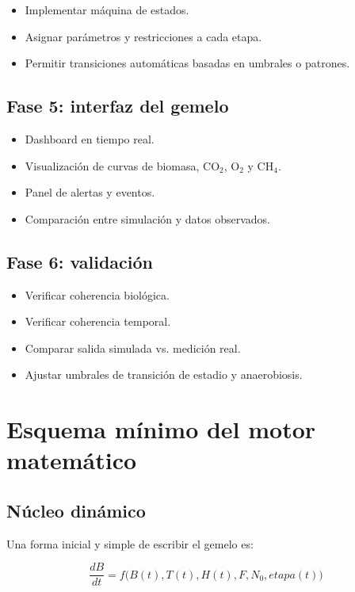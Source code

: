 \documentclass[12pt,a4paper]{report}
\begin{document}
\begin{itemize}[leftmargin=0.7cm]
    \item Implementar máquina de estados.
    \item Asignar parámetros y restricciones a cada etapa.
    \item Permitir transiciones automáticas basadas en umbrales o patrones.
\end{itemize}

\section{Fase 5: interfaz del gemelo}

\begin{itemize}[leftmargin=0.7cm]
    \item Dashboard en tiempo real.
    \item Visualización de curvas de biomasa, CO$_2$, O$_2$ y CH$_4$.
    \item Panel de alertas y eventos.
    \item Comparación entre simulación y datos observados.
\end{itemize}

\section{Fase 6: validación}

\begin{itemize}[leftmargin=0.7cm]
    \item Verificar coherencia biológica.
    \item Verificar coherencia temporal.
    \item Comparar salida simulada vs. medición real.
    \item Ajustar umbrales de transición de estadio y anaerobiosis.
\end{itemize}

\chapter{Esquema mínimo del motor matemático}

\section{Núcleo dinámico}

Una forma inicial y simple de escribir el gemelo es:

\begin{equation}
    \frac{dB}{dt} = f\big(B(t), T(t), H(t), F, N_0, etapa(t)\big)
\end{equation}
\end{document}

